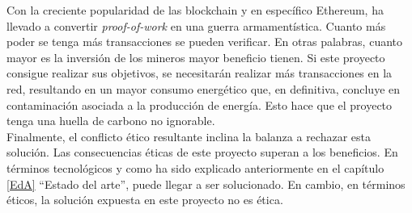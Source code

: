  Con la creciente popularidad de las blockchain y en específico Ethereum, ha llevado a convertir \textit{proof-of-work} en una guerra armamentística. Cuanto más poder se tenga más transacciones se pueden verificar. En otras palabras, cuanto mayor es la inversión de los mineros mayor beneficio tienen. Si este proyecto consigue realizar sus objetivos, se necesitarán realizar más transacciones en la red, resultando en un mayor consumo energético que, en definitiva, concluye en contaminación asociada a la producción de energía.  Esto hace que el proyecto tenga una huella de carbono no ignorable. \\
 Finalmente, el conflicto ético resultante inclina la balanza a rechazar esta solución. Las consecuencias éticas de este proyecto superan a los beneficios. En términos tecnológicos y como ha sido explicado anteriormente en el capítulo \ref{EdA} “Estado del arte”, puede llegar a ser solucionado. En cambio, en términos éticos, la solución expuesta en este proyecto no es ética.
\newpage
\thispagestyle{empty}